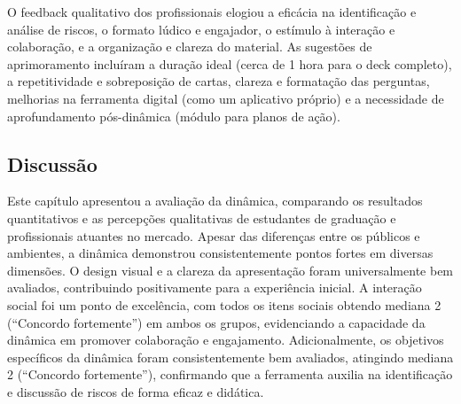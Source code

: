 \documentclass[12pt]{article}
\begin{document}
O feedback qualitativo dos profissionais elogiou a eficácia na identificação e análise de riscos, o formato lúdico e engajador, o estímulo à interação e colaboração, e a organização e clareza do material. As sugestões de aprimoramento incluíram a duração ideal (cerca de 1 hora para o deck completo), a repetitividade e sobreposição de cartas, clareza e formatação das perguntas, melhorias na ferramenta digital (como um aplicativo próprio) e a necessidade de aprofundamento pós-dinâmica (módulo para planos de ação).

\subsection{Discussão}

Este capítulo apresentou a avaliação da dinâmica, comparando os resultados quantitativos e as percepções qualitativas de estudantes de graduação e profissionais atuantes no mercado. Apesar das diferenças entre os públicos e ambientes, a dinâmica demonstrou consistentemente pontos fortes em diversas dimensões. O design visual e a clareza da apresentação foram universalmente bem avaliados, contribuindo positivamente para a experiência inicial. A interação social foi um ponto de excelência, com todos os itens sociais obtendo mediana 2 (“Concordo fortemente”) em ambos os grupos, evidenciando a capacidade da dinâmica em promover colaboração e engajamento. Adicionalmente, os objetivos específicos da dinâmica foram consistentemente bem avaliados, atingindo mediana 2 (“Concordo fortemente”), confirmando que a ferramenta auxilia na identificação e discussão de riscos de forma eficaz e didática.
\end{document}
